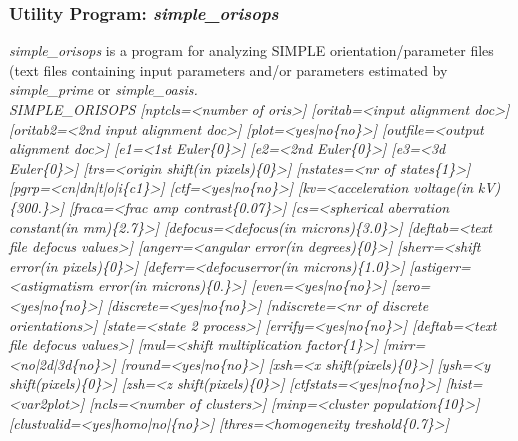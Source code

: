\documentclass[review]{elsarticle}
\begin{document}
{{\subsubsection{Utility Program: {\it{simple\_orisops}}}
\label{orisops}
{\it{simple\_orisops}} is a program for analyzing SIMPLE orientation/parameter files (text files containing input parameters and/or parameters estimated by {\it{simple\_prime}} or {\it{simple\_oasis}.}\\
{\it{SIMPLE\_ORISOPS [nptcls=<number of oris>] [oritab=<input alignment doc>]}}
{\it{[oritab2=<2nd input alignment doc>] [plot=<yes|no\{no\}>] [outfile=<output}}
{\it{alignment doc>] [e1=<1st Euler\{0\}>] [e2=<2nd Euler\{0\}>] [e3=<3d}}
{\it{Euler\{0\}>] [trs=<origin shift(in pixels)\{0\}>] [nstates=<nr of states\{1\}>]}}
{\it{[pgrp=<cn|dn|t|o|i\{c1\}>] [ctf=<yes|no\{no\}>] [kv=<acceleration voltage(in}}
{\it{kV)\{300.\}>] [fraca=<frac amp contrast\{0.07\}>] [cs=<spherical aberration}}
{\it{constant(in mm)\{2.7\}>] [defocus=<defocus(in microns)\{3.0\}>] [deftab=<text}}
{\it{file defocus values>] [angerr=<angular error(in degrees)\{0\}>] [sherr=<shift}}
{\it{error(in pixels)\{0\}>] [deferr=<defocuserror(in microns)\{1.0\}>]}}
{\it{[astigerr=<astigmatism error(in microns)\{0.\}>] [even=<yes|no\{no\}>]}}
{\it{[zero=<yes|no\{no\}>] [discrete=<yes|no\{no\}>] [ndiscrete=<nr of discrete}}
{\it{orientations>] [state=<state 2 process>] [errify=<yes|no\{no\}>] [deftab=<text}}
{\it{file defocus values>] [mul=<shift multiplication factor\{1\}>]}}
{\it{[mirr=<no|2d|3d\{no\}>] [round=<yes|no\{no\}>] [xsh=<x shift(pixels)\{0\}>]}}
{\it{[ysh=<y shift(pixels)\{0\}>] [zsh=<z shift(pixels)\{0\}>]}}
{\it{[ctfstats=<yes|no\{no\}>] [hist=<var2plot>] [ncls=<number of clusters>]}}
{\it{[minp=<cluster population\{10\}>] [clustvalid=<yes|homo|no|\{no\}>]}}
{\it{[thres=<homogeneity treshold\{0.7\}>]}}
\\\\
}}
\end{document}
